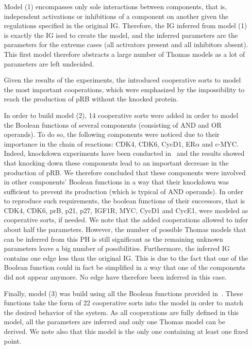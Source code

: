Model (1) encompasses only sole interactions between components, that is,
independent activations or inhibitions of a component on another given the regulations specified in the original IG.
Therefore, the IG inferred from model (1) is exactly the IG ised to create the model, and the inferred parameters
are the parameters for the extreme cases (all activators present and all inhibitors absent).
This first model therefore abstracts a large number of Thomas models as a lot of parameters are left undecided.

Given the results of the experiments, the introduced cooperative sorts to model the most important cooperations,
which were emphasized by the impossibility to reach the production of pRB without the knocked protein.

In order to build model (2), 14 cooperative sorts were added in order to model the Boolean functions of several components
(consisting of AND and OR operands).
To do so, the following components were noticed due to their importance in the chain of reactions:
CDK4, CDK6, CycD1, ER$\alpha$ and c-MYC.
Indeed, knockdown experiments have been conducted in~\cite{Sahin09}
and the results showed that knocking down these components lead to an important decrease in the production of pRB.
We therefore concluded that these components were involved in other components' Boolean functions
in a way that their knockdown was sufficient to prevent its production (which is typical of AND operands).
In order to reproduce such requirements, the boolean functions of their successors,
that is CDK4, CDK6, prB, p21, p27, IGF1R, MYC, CycD1 and CycE1,
were modeled as cooperative sorts, if needed.
We note that the added cooperations allowed to infer about half the parameters.
However, the number of possible Thomas models that can be inferred from this PH is still significant
as the remaining unknown parameters leave a big number of possibilities.
Furthermore, the inferred IG contains one edge less than the original IG. This is due to the fact that
one of the Boolean function could in fact be simplified in a way that one of the components did not appear anymore.
No edge have therefore been inferred in this case.

Finally, model (3) was build using all the Boolean functions provided in~\cite{Sahin09}.
These functions take the form of 22 cooperative sorts into the model in order to match the desired behavior of the system.
As all cooperations are fully defined in this model, all the parameters are inferred and only one Thomas model can be derived.
We note also that this model is the only one containing at least one fixed point.




